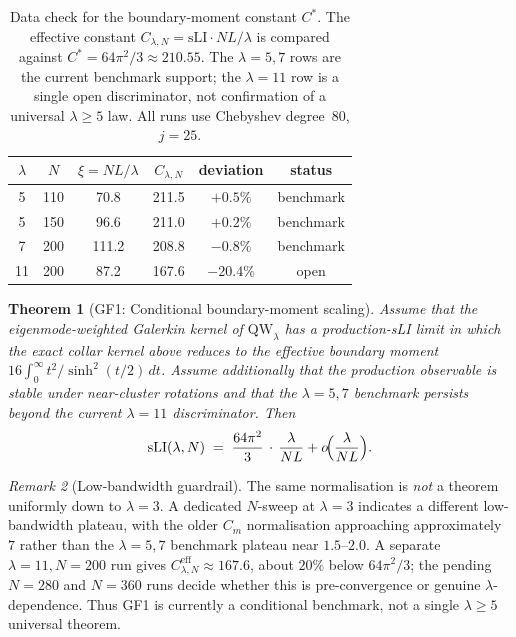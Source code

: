 \documentclass[12pt,a4paper]{article}
\newtheorem{theorem}{Theorem}[section]
\theoremstyle{definition}
\theoremstyle{remark}
\newtheorem{remark}[theorem]{Remark}
\begin{document}
\begin{table}[h]
\centering
\caption{Data check for the boundary-moment constant $C^*$. The effective constant $C_{\lambda,N} = \mathrm{sLI}\cdot NL/\lambda$ is compared against $C^* = 64\pi^2/3 \approx 210.55$. The $\lambda=5,7$ rows are the current benchmark support; the $\lambda=11$ row is a single open discriminator, not confirmation of a universal $\lambda\geq5$ law. All runs use Chebyshev degree~$80$, $j = 25$.}
\label{tab:gf1-data}
\begin{tabular}{cccccc}
\toprule
$\lambda$ & $N$ & $\xi=NL/\lambda$ & $C_{\lambda,N}$ & deviation & status \\
\midrule
5 & 110 & 70.8 & 211.5 & $+0.5\%$ & benchmark \\
5 & 150 & 96.6 & 211.0 & $+0.2\%$ & benchmark \\
7 & 200 & 111.2 & 208.8 & $-0.8\%$ & benchmark \\
11 & 200 & 87.2 & 167.6 & $-20.4\%$ & open \\
\bottomrule
\end{tabular}
\end{table}

\begin{theorem}[GF1: Conditional boundary-moment scaling]
\label{thm:GF1}
Assume that the eigenmode-weighted Galerkin kernel of
$\mathrm{QW}_\lambda$ has a production-sLI limit in which the exact
collar kernel above reduces to the effective boundary moment
$16\int_0^\infty t^2/\sinh^2(t/2)\,dt$. Assume additionally that the
production observable is stable under near-cluster rotations and that the
$\lambda=5,7$ benchmark persists beyond the current $\lambda=11$
discriminator. Then
\[
\mathrm{sLI}(\lambda, N) \;=\; \frac{64\pi^2}{3}\,\cdot\,\frac{\lambda}{NL} + o\!\Bigl(\frac{\lambda}{NL}\Bigr).
\]
\end{theorem}

\begin{remark}[Low-bandwidth guardrail]
\label{rem:gf1-lambda3}
The same normalisation is \emph{not} a theorem uniformly down to
$\lambda=3$. A dedicated $N$-sweep at $\lambda=3$ indicates a different
low-bandwidth plateau, with the older $C_m$ normalisation approaching
approximately~$7$ rather than the $\lambda=5,7$ benchmark plateau near
$1.5$--$2.0$. A separate $\lambda=11,N=200$ run gives
$C_{\lambda,N}^{\mathrm{eff}}\approx167.6$, about $20\%$ below
$64\pi^2/3$; the pending $N=280$ and $N=360$ runs decide whether this is
pre-convergence or genuine $\lambda$-dependence. Thus GF1 is currently a
conditional benchmark, not a single $\lambda\geq5$ universal theorem.
\end{remark}
\end{document}
